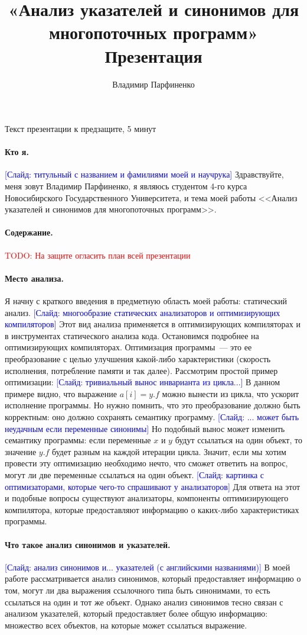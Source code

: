 \documentclass[12pt]{article}
\title{
  «Анализ указателей и синонимов для многопоточных программ»\\
  Презентация
}
\author{
  Владимир Парфиненко
}
\newcommand{\todo}[1]{\textcolor{red}{TODO: #1}}
\newcommand{\slide}[1]{\textcolor{Blue}{[Слайд: #1]}}
\begin{document}
  {\Large Текст презентации к предзащите, 5 минут}
  \vspace{5mm}

  \paragraph{Кто я.}
  \slide{титульный с названием и фамилиями моей и научрука}
  Здравствуйте, меня зовут Владимир Парфиненко, я являюсь студентом 4-го
  курса Новосибирского Государственного Университета, и тема моей работы
  <<Анализ указателей и синонимов для многопоточных программ>>.

  \paragraph{Содержание.} \todo{На защите огласить план всей презентации}

  \paragraph{Место анализа.}
  Я начну с краткого введения в предметную область моей работы: статический
  анализ.
  \slide{многообразие статических анализаторов и оптимизирующих компиляторов}
  Этот вид анализа применяется в оптимизирующих компиляторах и в инструментах
  статического анализа кода.  Остановимся подробнее на оптимизирующих
  компиляторах.
  Оптимизация программы~--- это ее преобразование с целью улучшения какой-либо
  характеристики (скорость исполнения, потребление памяти и так далее).
  Рассмотрим простой пример оптимизации:
  \slide{тривиальный вынос инварианта из цикла...}
  В данном примере видно, что выражение $a[i] = y.f$ можно вынести из цикла,
  что ускорит исполнение программы. Но нужно помнить, что это преобразование
  должно быть корректным: оно должно сохранять семантику программу.
  \slide{... может быть неудачным если переменные синонимы}
  Но подобный вынос может
  изменить семантику программы: если переменные $x$ и $y$ будут ссылаться на
  один объект, то значение $y.f$ будет разным на каждой итерации цикла.
  Значит, если мы хотим провести эту оптимизацию необходимо нечто, что
  сможет ответить на вопрос, могут ли две переменные ссылаться на один объект.
  \slide{картинка с оптимизаторами, которые чего-то спрашивают у анализаторов}
  Для ответа на этот и подобные вопросы существуют
  анализаторы, компоненты оптимизирующего компилятора, которые предоставляют
  информацию о каких-либо характеристиках программы.

  \paragraph{Что такое анализ синонимов и указателей.}
  \slide{анализ синонимов и... указателей (с английскими названиями)}
  В моей работе рассматривается анализ синонимов, который предоставляет
  информацию о том, могут ли два выражения ссылочного типа быть синонимами, то
  есть ссылаться на один и тот же объект. Однако анализ синонимов тесно связан
  с анализом указателей, который предоставляет более общую информацию:
  множество всех объектов, на которые может ссылаться выражение.
\end{document}
